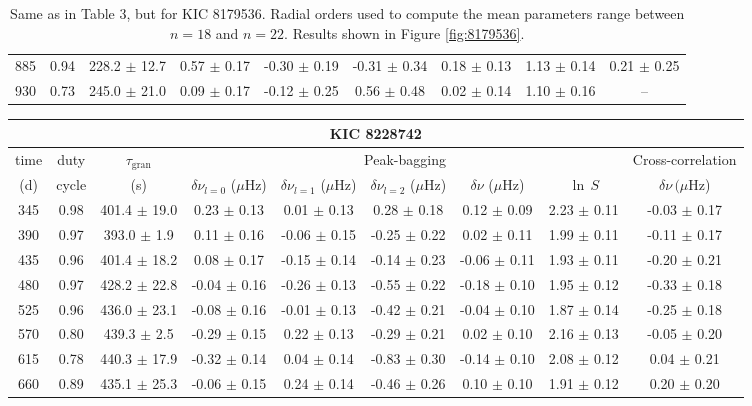 \documentclass[twocolumn]{aastex61}%
\begin{document}
\begin{table*}[ht]
\begin{tabular}{ccc|ccccc|c}
885 & 0.94 & 228.2 $\pm$ 12.7 & 0.57 $\pm$ 0.17 & -0.30 $\pm$ 0.19 & -0.31 $\pm$ 0.34 & 0.18 $\pm$ 0.13 & 1.13 $\pm$ 0.14 & 0.21 $\pm$ 0.25\\
930 & 0.73 & 245.0 $\pm$ 21.0 & 0.09 $\pm$ 0.17 & -0.12 $\pm$ 0.25 & 0.56 $\pm$ 0.48 & 0.02 $\pm$ 0.14 & 1.10 $\pm$ 0.16 & --\\
\end{tabular}
\caption{Same as in Table 3, but for KIC 8179536. Radial orders used to compute the mean parameters range between $n=18$ and $n=22$. Results shown in Figure \ref{fig:8179536}.}\label{tab:8179536}
\end{table*}

\begin{table*}[ht]\centering\fontsize{9.}{7.}\selectfont
\begin{tabular}{ccc|ccccc|c}
\multicolumn{9}{c}{KIC 8228742}\\ \hline\hline
time & duty & $\tau_\text{gran}$ &\multicolumn{5}{c|}{Peak-bagging}&Cross-correlation\\
(d)& cycle & (s)&$\delta\nu_{l=0}$ ($\mu$Hz) & $\delta\nu_{l=1}$ ($\mu$Hz) & $\delta\nu_{l=2}$ ($\mu$Hz) & $\delta\nu$ ($\mu$Hz)& $\ln\,S$ & $\delta\nu\,(\mu$Hz)\\\hline
345 & 0.98 & 401.4 $\pm$ 19.0 & 0.23 $\pm$ 0.13 & 0.01 $\pm$ 0.13 & 0.28 $\pm$ 0.18 & 0.12 $\pm$ 0.09 & 2.23 $\pm$ 0.11 & -0.03 $\pm$ 0.17\\
390 & 0.97 & 393.0 $\pm$ 1.9 & 0.11 $\pm$ 0.16 & -0.06 $\pm$ 0.15 & -0.25 $\pm$ 0.22 & 0.02 $\pm$ 0.11 & 1.99 $\pm$ 0.11 & -0.11 $\pm$ 0.17\\
435 & 0.96 & 401.4 $\pm$ 18.2 & 0.08 $\pm$ 0.17 & -0.15 $\pm$ 0.14 & -0.14 $\pm$ 0.23 & -0.06 $\pm$ 0.11 & 1.93 $\pm$ 0.11 & -0.20 $\pm$ 0.21\\
480 & 0.97 & 428.2 $\pm$ 22.8 & -0.04 $\pm$ 0.16 & -0.26 $\pm$ 0.13 & -0.55 $\pm$ 0.22 & -0.18 $\pm$ 0.10 & 1.95 $\pm$ 0.12 & -0.33 $\pm$ 0.18\\
525 & 0.96 & 436.0 $\pm$ 23.1 & -0.08 $\pm$ 0.16 & -0.01 $\pm$ 0.13 & -0.42 $\pm$ 0.21 & -0.04 $\pm$ 0.10 & 1.87 $\pm$ 0.14 & -0.25 $\pm$ 0.18\\
570 & 0.80 & 439.3 $\pm$ 2.5 & -0.29 $\pm$ 0.15 & 0.22 $\pm$ 0.13 & -0.29 $\pm$ 0.21 & 0.02 $\pm$ 0.10 & 2.16 $\pm$ 0.13 & -0.05 $\pm$ 0.20\\
615 & 0.78 & 440.3 $\pm$ 17.9 & -0.32 $\pm$ 0.14 & 0.04 $\pm$ 0.14 & -0.83 $\pm$ 0.30 & -0.14 $\pm$ 0.10 & 2.08 $\pm$ 0.12 & 0.04 $\pm$ 0.21\\
660 & 0.89 & 435.1 $\pm$ 25.3 & -0.06 $\pm$ 0.15 & 0.24 $\pm$ 0.14 & -0.46 $\pm$ 0.26 & 0.10 $\pm$ 0.10 & 1.91 $\pm$ 0.12 & 0.20 $\pm$ 0.20\\

\end{tabular}
\end{table*}
\end{document}
